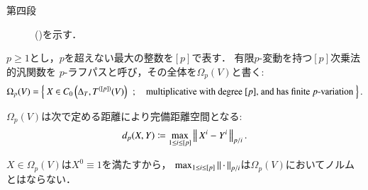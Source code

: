 \begin{prf}
\begin{description}
			\item[第四段]
				()を示す．
		\end{description}
		
	\end{prf}
	
	\begin{screen}
		\begin{dfn}[$p$-ラフパス]
			$p \geq 1$とし，$p$を超えない最大の整数を$[p]$で表す．
			有限$p$-変動を持つ$[p]$次乗法的汎関数を
			$p$-ラフパスと呼び，その全体を$\Omega_p(V)$と書く:
			\begin{align}
				\Omega_p(V) 
				= \left\{\ X \in C_0\left( \Delta_T,T^{([p])}(V) \right)\ \, ; \quad 
					\mbox{multiplicative with degree $[p]$,
					 and has finite $p$-variation}\ \right\}.
			\end{align}
		\end{dfn}
	\end{screen}
	
	\begin{screen}
		\begin{thm}\label{thm:p_rough_path_complete_dist}
			$\Omega_p(V)$は次で定める距離により完備距離空間となる:
			\begin{align}
				d_p(X,Y) \coloneqq \operatorname*{max}_{1 \leq i \leq [p]} \left\|\, X^i - Y^i\, \right\|_{p/i}.
			\end{align}
		\end{thm}
	\end{screen}
	
	$X \in \Omega_p(V)$は$X^0 \equiv 1$を満たすから，
	$\operatorname*{max}_{1 \leq i \leq [p]} \left\|\, \cdot\, \right\|_{p/i}$は$\Omega_p(V)$においてノルムとはならない．
	
